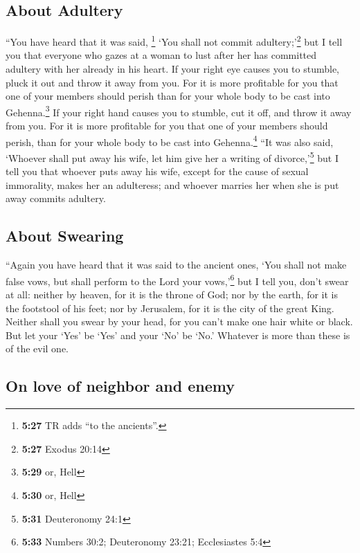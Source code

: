 \hypertarget{about-adultery}{%
\subsection{About Adultery}\label{about-adultery}}

 ``You have heard that it was said, \footnote{\textbf{5:27}
  TR adds ``to the ancients''.} `You shall not commit
adultery;'\footnote{\textbf{5:27} Exodus 20:14}  but I
tell you that everyone who gazes at a woman to lust after her has
committed adultery with her already in his heart.  If
your right eye causes you to stumble, pluck it out and throw it away
from you. For it is more profitable for you that one of your members
should perish than for your whole body to be cast into
Gehenna.\footnote{\textbf{5:29} or, Hell}  If your right
hand causes you to stumble, cut it off, and throw it away from you. For
it is more profitable for you that one of your members should perish,
than for your whole body to be cast into Gehenna.\footnote{\textbf{5:30}
  or, Hell}  ``It was also said, `Whoever shall put away
his wife, let him give her a writing of divorce,'\footnote{\textbf{5:31}
  Deuteronomy 24:1}  but I tell you that whoever puts
away his wife, except for the cause of sexual immorality, makes her an
adulteress; and whoever marries her when she is put away commits
adultery.

\hypertarget{about-swearing}{%
\subsection{About Swearing}\label{about-swearing}}

 ``Again you have heard that it was said to the ancient
ones, `You shall not make false vows, but shall perform to the Lord your
vows,'\footnote{\textbf{5:33} Numbers 30:2; Deuteronomy 23:21;
  Ecclesiastes 5:4}  but I tell you, don't swear at all:
neither by heaven, for it is the throne of God;  nor by
the earth, for it is the footstool of his feet; nor by Jerusalem, for it
is the city of the great King.  Neither shall you swear
by your head, for you can't make one hair white or black.
 But let your `Yes' be `Yes' and your `No' be `No.'
Whatever is more than these is of the evil one.

\hypertarget{on-love-of-neighbor-and-enemy}{%
\subsection{On love of neighbor and
enemy}\label{on-love-of-neighbor-and-enemy}}

